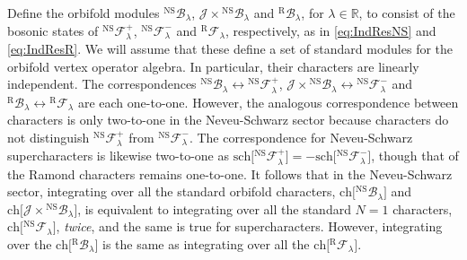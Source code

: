 \documentclass[a4paper,reqno,12pt]{report}
\theoremstyle{definition}
\numberwithin{equation}{section}
\newcommand{\RR}{\mathbb{R}}
\newcommand{\Fock}[1]{\mathcal{F}_{#1}}      %
\newcommand{\chmap}{\mathrm{ch}}
\newcommand{\schmap}{\mathrm{sch}}
\newcommand{\Gr}[1]{\bigl[ #1 \bigr]}            %
\newcommand{\ch}[1]{\chmap \Gr{#1}}              %
\newcommand{\sch}[1]{\schmap \Gr{#1}}              %
\newcommand{\fuse}{\mathbin{\times}}                                            %
\newcommand{\ns}{Neveu-Schwarz}
\theoremstyle{plain}
\newcommand{\Mod}[1]{\mathcal{#1}}                 %
\newcommand{\NSFock}[1]{{}^{\text{NS}}\Fock{#1}}   %
\newcommand{\RFock}[1]{{}^{\text{R}}\Fock{#1}}     %
\newcommand{\Orb}[1]{\Mod{B}_{#1}}                 %
\newcommand{\NSOrb}[1]{{}^{\text{NS}}\Orb{#1}}     %
\newcommand{\ROrb}[1]{{}^{\text{R}}\Orb{#1}}       %
\begin{document}
Define the orbifold modules $\NSOrb{\lambda}$, $\Mod{J} \fuse \NSOrb{\lambda}$ and $\ROrb{\lambda}$, for $\lambda \in \RR$, to consist of the bosonic states of $\NSFock{\lambda}^+$, $\NSFock{\lambda}^-$ and $\RFock{\lambda}$, respectively, as in \eqref{eq:IndResNS} and \eqref{eq:IndResR}.  We will assume that these define a set of standard modules for the orbifold vertex operator algebra.  In particular, their characters are linearly independent.  The correspondences $\NSOrb{\lambda} \leftrightarrow \NSFock{\lambda}^+$, $\Mod{J} \fuse \NSOrb{\lambda} \leftrightarrow \NSFock{\lambda}^-$ and $\ROrb{\lambda} \leftrightarrow \RFock{\lambda}$ are each one-to-one.  However, the analogous correspondence between characters is only two-to-one in the \ns{} sector because characters do not distinguish $\NSFock{\lambda}^+$ from $\NSFock{\lambda}^-$.  The correspondence for \ns{} supercharacters is likewise two-to-one as $\sch{\NSFock{\lambda}^+} = -\sch{\NSFock{\lambda}^-}$, though that of the Ramond characters remains one-to-one.  It follows that in the \ns{} sector, integrating over all the standard orbifold characters, $\ch{\NSOrb{\lambda}}$ and $\ch{\Mod{J} \fuse \NSOrb{\lambda}}$, is equivalent to integrating over all the standard $N=1$ characters, $\ch{\NSFock{\lambda}}$, \emph{twice}, and the same is true for supercharacters.  However, integrating over the $\ch{\ROrb{\lambda}}$ is the same as integrating over all the $\ch{\RFock{\lambda}}$.
\end{document}
